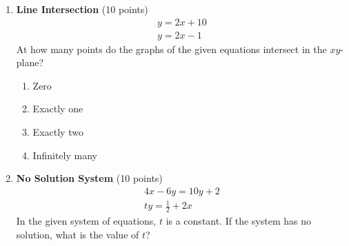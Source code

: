 \begin{enumerate}
  \newpage

  \item \textbf{Line Intersection} (10 points)\\
  \[\begin{gathered}
  y=2x+10 \\
  y=2x-1
  \end{gathered}\]
  At how many points do the graphs of the given equations intersect in the $xy$-plane?\\
  \begin{enumerate}[label=(\Alph*)]
    \item Zero
    \item Exactly one
    \item Exactly two
    \item Infinitely many
  \end{enumerate}
  \begin{subanswer}
  \end{subanswer}

  \item \textbf{No Solution System} (10 points)\\
  \[\begin{gathered}
  4x-6y=10y+2 \\
  ty=\frac{1}{2}+2x
  \end{gathered}\]
  In the given system of equations, $t$ is a constant. If the system has no solution, what is the value of $t$?
  \begin{subanswer}
  \end{subanswer}


\end{enumerate}
